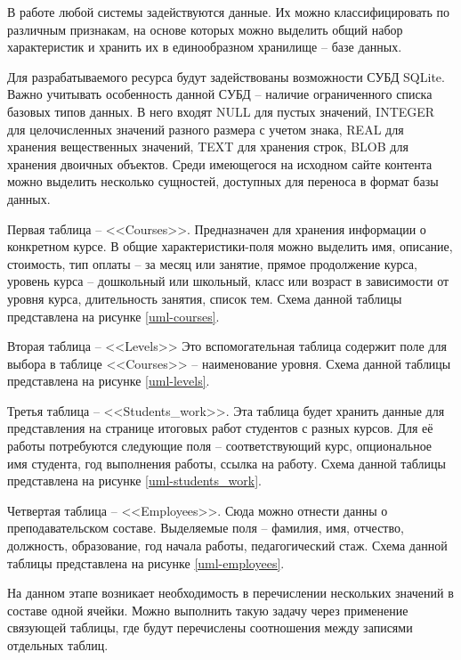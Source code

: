 В работе любой системы задействуются данные.
Их можно классифицировать по различным признакам, на основе которых можно выделить общий набор характеристик и хранить их в единообразном хранилище -- базе данных.

Для разрабатываемого ресурса будут задействованы возможности СУБД SQLite.
Важно учитывать особенность данной СУБД -- наличие ограниченного списка базовых типов данных.
В него входят NULL для пустых значений, INTEGER для целочисленных значений разного размера с учетом знака, REAL для хранения вещественных значений, TEXT для хранения строк, BLOB для хранения двоичных объектов.
Среди имеющегося на исходном сайте контента можно выделить несколько сущностей, доступных для переноса в формат базы данных.

Первая таблица -- <<Courses>>.
Предназначен для хранения информации о конкретном курсе.
В общие характеристики-поля можно выделить имя, описание, стоимость, тип оплаты -- за месяц или занятие, прямое продолжение курса, уровень курса -- дошкольный или школьный, класс или возраст в зависимости от уровня курса, длительность занятия, список тем.
Схема данной таблицы представлена на рисунке \ref{uml-courses}.

Вторая таблица -- <<Levels>>
Это вспомогательная таблица содержит поле для выбора в таблице <<Courses>> -- наименование уровня.
Схема данной таблицы представлена на рисунке \ref{uml-levels}.

Третья таблица -- <<Students\_work>>.
Эта таблица будет хранить данные для представления на странице итоговых работ студентов с разных курсов.
Для её работы потребуются следующие поля -- соответствующий курс, опциональное имя студента, год выполнения работы, ссылка на работу.
Схема данной таблицы представлена на рисунке \ref{uml-students_work}.

Четвертая таблица -- <<Employees>>.
Сюда можно отнести данны о преподавательском составе.
Выделяемые поля -- фамилия, имя, отчество, должность, образование, год начала работы, педагогический стаж.
Схема данной таблицы представлена на рисунке \ref{uml-employees}.

На данном этапе возникает необходимость в перечислении нескольких значений в составе одной ячейки.
Можно выполнить такую задачу через применение связующей таблицы, где будут перечислены соотношения между записями отдельных таблиц.

